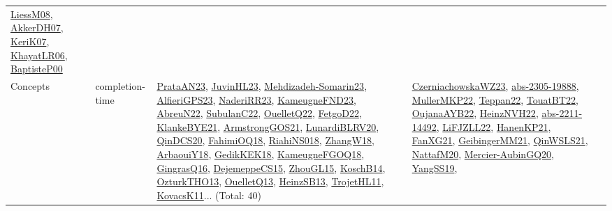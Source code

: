 {\begin{longtable}{lp{3cm}>{\raggedright}p{6cm}>{\raggedright}p{6cm}p{8cm}}
\href{articles/LiessM08.pdf}{LiessM08}\cite{LiessM08}, \href{papers/AkkerDH07.pdf}{AkkerDH07}\cite{AkkerDH07}, \href{papers/KeriK07.pdf}{KeriK07}\cite{KeriK07}, \href{articles/KhayatLR06.pdf}{KhayatLR06}\cite{KhayatLR06}, \href{articles/BaptisteP00.pdf}{BaptisteP00}\cite{BaptisteP00}\\
Concepts & completion-time & \href{articles/PrataAN23.pdf}{PrataAN23}\cite{PrataAN23}, \href{papers/JuvinHL23.pdf}{JuvinHL23}\cite{JuvinHL23}, \href{papers/Mehdizadeh-Somarin23.pdf}{Mehdizadeh-Somarin23}\cite{Mehdizadeh-Somarin23}, \href{articles/AlfieriGPS23.pdf}{AlfieriGPS23}\cite{AlfieriGPS23}, \href{articles/NaderiRR23.pdf}{NaderiRR23}\cite{NaderiRR23}, \href{papers/KameugneFND23.pdf}{KameugneFND23}\cite{KameugneFND23}, \href{articles/AbreuN22.pdf}{AbreuN22}\cite{AbreuN22}, \href{articles/SubulanC22.pdf}{SubulanC22}\cite{SubulanC22}, \href{papers/OuelletQ22.pdf}{OuelletQ22}\cite{OuelletQ22}, \href{articles/FetgoD22.pdf}{FetgoD22}\cite{FetgoD22}, \href{papers/KlankeBYE21.pdf}{KlankeBYE21}\cite{KlankeBYE21}, \href{papers/ArmstrongGOS21.pdf}{ArmstrongGOS21}\cite{ArmstrongGOS21}, \href{articles/LunardiBLRV20.pdf}{LunardiBLRV20}\cite{LunardiBLRV20}, \href{articles/QinDCS20.pdf}{QinDCS20}\cite{QinDCS20}, \href{articles/FahimiOQ18.pdf}{FahimiOQ18}\cite{FahimiOQ18}, \href{papers/RiahiNS018.pdf}{RiahiNS018}\cite{RiahiNS018}, \href{articles/ZhangW18.pdf}{ZhangW18}\cite{ZhangW18}, \href{papers/ArbaouiY18.pdf}{ArbaouiY18}\cite{ArbaouiY18}, \href{articles/GedikKEK18.pdf}{GedikKEK18}\cite{GedikKEK18}, \href{papers/KameugneFGOQ18.pdf}{KameugneFGOQ18}\cite{KameugneFGOQ18}, \href{papers/GingrasQ16.pdf}{GingrasQ16}\cite{GingrasQ16}, \href{papers/DejemeppeCS15.pdf}{DejemeppeCS15}\cite{DejemeppeCS15}, \href{papers/ZhouGL15.pdf}{ZhouGL15}\cite{ZhouGL15}, \href{papers/KoschB14.pdf}{KoschB14}\cite{KoschB14}, \href{articles/OzturkTHO13.pdf}{OzturkTHO13}\cite{OzturkTHO13}, \href{papers/OuelletQ13.pdf}{OuelletQ13}\cite{OuelletQ13}, \href{articles/HeinzSB13.pdf}{HeinzSB13}\cite{HeinzSB13}, \href{articles/TrojetHL11.pdf}{TrojetHL11}\cite{TrojetHL11}, \href{articles/KovacsK11.pdf}{KovacsK11}\cite{KovacsK11}... (Total: 40) & \href{articles/CzerniachowskaWZ23.pdf}{CzerniachowskaWZ23}\cite{CzerniachowskaWZ23}, \href{articles/abs-2305-19888.pdf}{abs-2305-19888}\cite{abs-2305-19888}, \href{articles/MullerMKP22.pdf}{MullerMKP22}\cite{MullerMKP22}, \href{papers/Teppan22.pdf}{Teppan22}\cite{Teppan22}, \href{papers/TouatBT22.pdf}{TouatBT22}\cite{TouatBT22}, \href{papers/OujanaAYB22.pdf}{OujanaAYB22}\cite{OujanaAYB22}, \href{articles/HeinzNVH22.pdf}{HeinzNVH22}\cite{HeinzNVH22}, \href{articles/abs-2211-14492.pdf}{abs-2211-14492}\cite{abs-2211-14492}, \href{papers/LiFJZLL22.pdf}{LiFJZLL22}\cite{LiFJZLL22}, \href{papers/HanenKP21.pdf}{HanenKP21}\cite{HanenKP21}, \href{articles/FanXG21.pdf}{FanXG21}\cite{FanXG21}, \href{papers/GeibingerMM21.pdf}{GeibingerMM21}\cite{GeibingerMM21}, \href{articles/QinWSLS21.pdf}{QinWSLS21}\cite{QinWSLS21}, \href{papers/NattafM20.pdf}{NattafM20}\cite{NattafM20}, \href{papers/Mercier-AubinGQ20.pdf}{Mercier-AubinGQ20}\cite{Mercier-AubinGQ20}, \href{papers/YangSS19.pdf}{YangSS19}\cite{YangSS19}, 
\end{longtable}}

